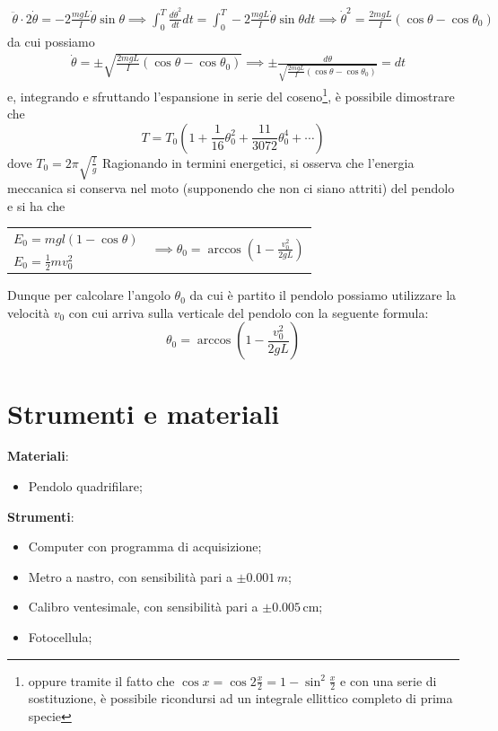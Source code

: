 \documentclass{article}
\begin{document}
	\begin{align*}
		\ddot{\theta} \cdot 2 \dot{\theta} = -2\frac{mgL}{I}\dot{\theta}\sin{\theta} \implies \int_0^T \frac{d\dot{\theta}^2}{dt} dt = \int_0^T -2\frac{mgL}{I}\dot{\theta}\sin{\theta} dt \implies \dot{\theta}^2 = \frac{2mgL}{I}(\cos{\theta} - \cos{\theta_0})
	\end{align*}
	da cui possiamo 
	\begin{align*}
		&\dot{\theta} = \pm \sqrt{\frac{2mgL}{I}(\cos{\theta} - \cos{\theta_0})} \implies \pm \frac{d\theta}{\sqrt{\frac{2mgL}{I}(\cos{\theta} - \cos{\theta_0})} } = dt
	\end{align*}
	e, integrando e sfruttando l'espansione in serie del coseno\footnote{oppure tramite il fatto che $\cos{x} = \cos{2\frac{x}{2}} = 1 - \sin^2{\frac{x}{2}}$ e con una serie di sostituzione, è possibile ricondursi ad un integrale ellittico completo di prima specie}, è possibile dimostrare che
	\begin{equation}
		T = T_0 \left( 1 + \frac{1}{16}\theta_0^2 + \frac{11}{3072}\theta_0^4 + \cdots \right)
	\end{equation}
	dove $T_0 = 2\pi\sqrt{\frac{l}{g}}$
	Ragionando in termini energetici, si osserva che l'energia meccanica si conserva nel moto (supponendo che non ci siano attriti) del pendolo e si ha che

\begin{table}[H]
    \centering
    \begin{tabular}{l c}
        $E_0 = mgl(1-\cos{\theta})$ & \multirow{2}{*}{$\implies \theta_0 = \arccos{ \left(1 - \frac{v_0^2}{2gL} \right)}$} \\
         $E_0 = \frac{1}{2}mv_0^2$ &  \\
    \end{tabular}
\end{table}

\noindent Dunque per calcolare l'angolo $\theta_0$ da cui è partito il pendolo possiamo utilizzare la velocità $v_0$ con cui arriva sulla verticale del pendolo con la seguente formula:
\begin{equation} \label{eq:angolo}
	\theta_0 = \arccos{\left(1- \frac{v_0^2}{2gL} \right) }
\end{equation}
	\section{Strumenti e materiali}
	\textbf{Materiali}:
	\begin{itemize}
		\item Pendolo quadrifilare;
	\end{itemize}
	\textbf{Strumenti}:
	\begin{itemize}
		\item Computer con programma di acquisizione;
		\item Metro a nastro, con sensibilità pari a $\pm 0.001 \, \si{m}$;
		\item Calibro ventesimale, con sensibilità pari a $\pm 0.005 \, \si{\centi\meter}$;
		\item Fotocellula;
	\end{itemize}
\end{document}
